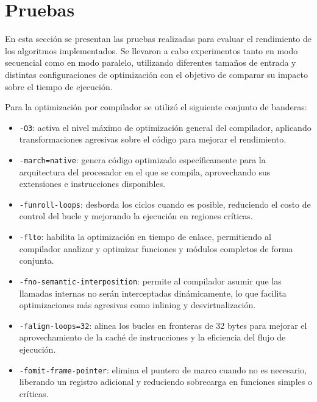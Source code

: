 \section{Pruebas}

En esta sección se presentan las pruebas realizadas para evaluar el rendimiento de los algoritmos implementados. Se llevaron a cabo experimentos tanto en modo secuencial como en modo paralelo, utilizando diferentes tamaños de entrada y distintas configuraciones de optimización con el objetivo de comparar su impacto sobre el tiempo de ejecución.

Para la optimización por compilador se utilizó el siguiente conjunto de banderas:

\begin{itemize}
    \item \texttt{-O3}: activa el nivel máximo de optimización general del compilador, aplicando transformaciones agresivas sobre el código para mejorar el rendimiento.
    \item \texttt{-march=native}: genera código optimizado específicamente para la arquitectura del procesador en el que se compila, aprovechando sus extensiones e instrucciones disponibles.
    \item \texttt{-funroll-loops}: desborda los ciclos cuando es posible, reduciendo el costo de control del bucle y mejorando la ejecución en regiones críticas.
    \item \texttt{-flto}: habilita la optimización en tiempo de enlace, permitiendo al compilador analizar y optimizar funciones y módulos completos de forma conjunta.
    \item \texttt{-fno-semantic-interposition}: permite al compilador asumir que las llamadas internas no serán interceptadas dinámicamente, lo que facilita optimizaciones más agresivas como inlining y desvirtualización.
    \item \texttt{-falign-loops=32}: alinea los bucles en fronteras de 32 bytes para mejorar el aprovechamiento de la caché de instrucciones y la eficiencia del flujo de ejecución.
    \item \texttt{-fomit-frame-pointer}: elimina el puntero de marco cuando no es necesario, liberando un registro adicional y reduciendo sobrecarga en funciones simples o críticas.
\end{itemize}








